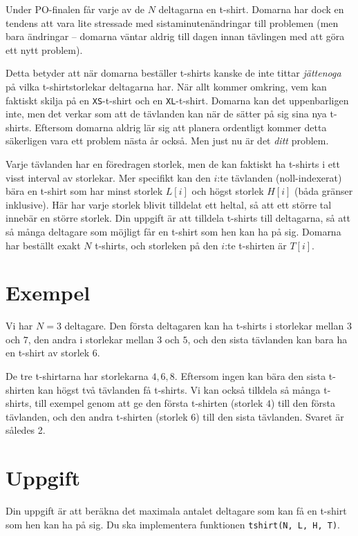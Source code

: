 \newcommand\version{v1}
Under PO-finalen får varje av de $N$ deltagarna en t-shirt. Domarna har dock en tendens att vara lite
stressade med sistaminutenändringar till problemen (men bara ändringar -- domarna väntar aldrig
till dagen innan tävlingen med att göra ett nytt problem).

Detta betyder att när domarna beställer t-shirts kanske de inte tittar \emph{jättenoga} på vilka
t-shirtstorlekar deltagarna har. När allt kommer omkring, vem kan faktiskt
skilja på en \texttt{XS}-t-shirt och en \texttt{XL}-t-shirt. Domarna kan det uppenbarligen inte, men
det verkar som att de tävlanden kan när de sätter på sig sina nya t-shirts.
Eftersom domarna aldrig lär sig att planera ordentligt kommer detta säkerligen vara ett problem nästa år också.
Men just nu är det \emph{ditt} problem.

Varje tävlanden har en föredragen storlek, men de kan faktiskt ha t-shirts i ett visst interval av storlekar.
Mer specifikt kan den $i$:te tävlanden (noll-indexerat) bära en t-shirt som har minst storlek $L[i]$ och högst
storlek $H[i]$ (båda gränser inklusive).
Här har varje storlek blivit tilldelat ett heltal, så att ett större tal innebär en större storlek.
Din uppgift är att tilldela t-shirts till deltagarna, så att så många deltagare som möjligt får en
t-shirt som hen kan ha på sig. Domarna har beställt exakt $N$ t-shirts, och storleken på den $i$:te t-shirten
är $T[i]$.

\section*{Exempel}
Vi har $N = 3$ deltagare. Den första deltagaren kan ha t-shirts i storlekar mellan $3$ och $7$, 
den andra i storlekar mellan $3$ och $5$, och den sista tävlanden kan bara ha en t-shirt av storlek $6$.

De tre t-shirtarna har storlekarna $4, 6, 8$. Eftersom ingen kan bära den sista t-shirten kan högst
två tävlanden få t-shirts. Vi kan också tilldela så många t-shirts, till exempel genom att ge den
första t-shirten (storlek $4$) till den första tävlanden, och den andra t-shirten (storlek $6$) till den
sista tävlanden. Svaret är således 2.

\section*{Uppgift}
Din uppgift är att beräkna det maximala antalet deltagare som kan få en t-shirt som hen kan ha på sig.
Du ska implementera funktionen \texttt{tshirt(N, L, H, T)}.

